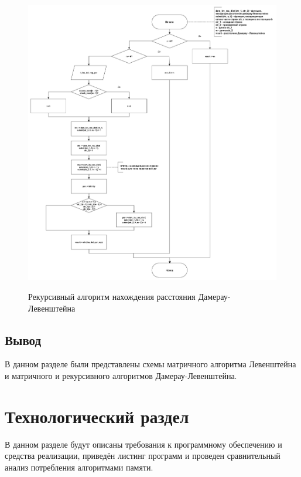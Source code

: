 \documentclass[a4paper,12pt]{article}
\begin{document}
	    \begin{figure}[h!]
	    	\begin{center}
	    		{\includegraphics[width = \textwidth]{schema03.pdf}}
	    		\caption{Рекурсивный алгоритм нахождения расстояния Дамерау-							Левенштейна}
	    		\label{fig:schema_dam_lev_rec}
	    	\end{center}
	    \end{figure}
	    
	\subsection*{Вывод}
	В данном разделе были представлены схемы матричного алгоритма Левенштейна и 				матричного и рекурсивного алгоритмов Дамерау-Левенштейна.


	
	 
	
    
\pagebreak    

\section{Технологический раздел}

	В данном разделе будут описаны требования к программному обеспечению и средства реализации, приведён листинг программ и проведен сравнительный анализ потребления алгоритмами памяти.
\end{document}
